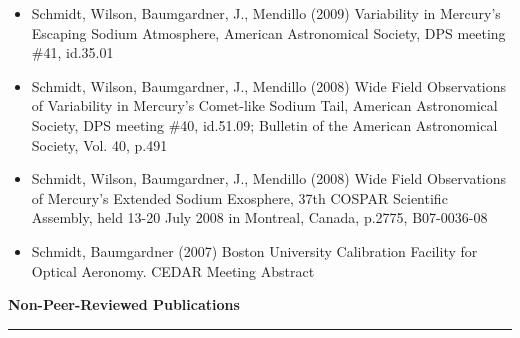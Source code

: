 \documentclass[12pt]{report}
\begin{document}
\begin{itemize}
   \item Schmidt, Wilson, Baumgardner, J., Mendillo (2009) Variability in Mercury's Escaping Sodium Atmosphere, American Astronomical Society, DPS meeting \#41, id.35.01
   \item Schmidt, Wilson, Baumgardner, J., Mendillo (2008) Wide Field Observations of Variability in Mercury's Comet-like Sodium Tail, American Astronomical Society, DPS meeting \#40, id.51.09; Bulletin of the American Astronomical Society, Vol. 40, p.491
   \item Schmidt, Wilson, Baumgardner, J., Mendillo (2008) Wide Field Observations of Mercury's Extended Sodium Exosphere, 37th COSPAR Scientific Assembly, held 13-20 July 2008 in Montreal, Canada, p.2775, B07-0036-08
   \item Schmidt, Baumgardner (2007) Boston University Calibration Facility for Optical Aeronomy. CEDAR Meeting Abstract
  \end{itemize}
\vspace{2 mm}
\noindent\bf{Non-Peer-Reviewed Publications}\rm \hspace*{\fill} \\
\rule{\textwidth}{1pt}
\end{document}
